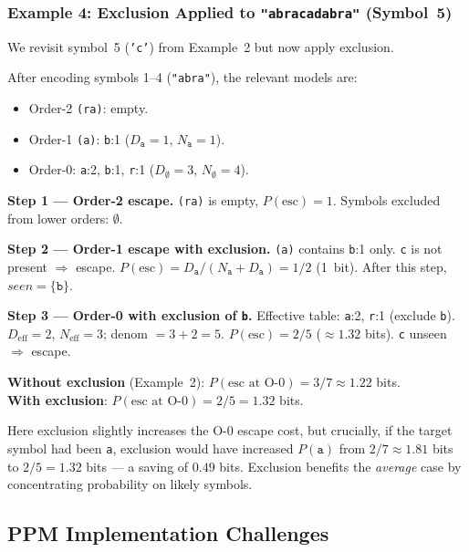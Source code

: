 \subsubsection{Example 4: Exclusion Applied to \texttt{"abracadabra"} (Symbol~5)}

We revisit symbol~5 (\texttt{'c'}) from Example~2 but now apply exclusion.

After encoding symbols 1--4 (\texttt{"abra"}), the relevant models are:
\begin{itemize}
    \item Order-2 \texttt{(ra)}: empty.
    \item Order-1 \texttt{(a)}: \texttt{b}:1 ($D_{\texttt{a}}=1$, $N_{\texttt{a}}=1$).
    \item Order-0: \texttt{a}:2, \texttt{b}:1, \texttt{r}:1 ($D_{\emptyset}=3$, $N_{\emptyset}=4$).
\end{itemize}

\textbf{Step 1 --- Order-2 escape.} \texttt{(ra)} is empty, $P(\text{esc})=1$.
Symbols excluded from lower orders: $\emptyset$.

\textbf{Step 2 --- Order-1 escape with exclusion.} \texttt{(a)} contains
\texttt{b}:1 only. \texttt{c} is not present $\Rightarrow$ escape.
$P(\text{esc}) = D_{\texttt{a}}/(N_{\texttt{a}}+D_{\texttt{a}}) = 1/2$ (1~bit). 
After this step, $seen = \{\texttt{b}\}$.

\textbf{Step 3 --- Order-0 with exclusion of \texttt{b}.} Effective table:
\texttt{a}:2, \texttt{r}:1 (exclude \texttt{b}). $D_{\mathrm{eff}} = 2$,
$N_{\mathrm{eff}} = 3$; denom $= 3+2 = 5$.
$P(\text{esc}) = 2/5$ ($\approx 1.32$ bits). \texttt{c} unseen $\Rightarrow$ escape.

\textbf{Without exclusion} (Example~2): $P(\text{esc at O-0}) = 3/7 \approx 1.22$ bits.\\
\textbf{With exclusion}: $P(\text{esc at O-0}) = 2/5 = 1.32$ bits.

Here exclusion slightly increases the O-0 escape cost, but crucially, if the target
symbol had been \texttt{a}, exclusion would have increased $P(\texttt{a})$ from
$2/7 \approx 1.81$ bits to $2/5 = 1.32$ bits --- a saving of $0.49$ bits. Exclusion
benefits the \emph{average} case by concentrating probability on likely symbols.

\subsection{PPM Implementation Challenges}

